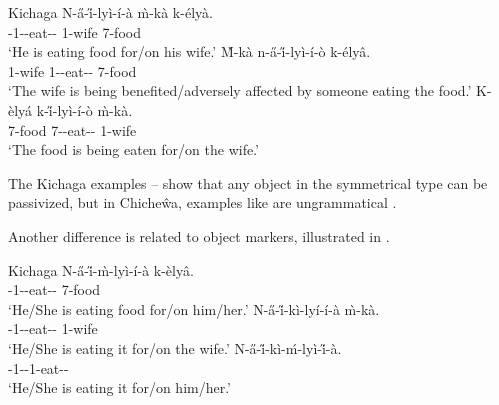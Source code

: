 \documentclass[output=paper,hidelinks]{langscibook}
\begin{document}
\ea\label{ex:African:18} Kichaga
\ea\label{ex:African:18a}
    {\gll N-\H{a}-\H{i}-lyì-í-à  \`{m}-kà    k-élyà.\\
        {\FOC}-1{\SBJ}-{\PROG}-eat-{}- 1-wife  7-food\\}
    \glt ‘He is eating food for/on his wife.’
\ex\label{ex:African:18b}
    {\gll \`{M}-kà   n-\H{a}-\H{i}-lyì-í-ò k-élyâ.\\
        1-wife 1{\SBJ}-{\PROG}-eat-{}-{\PASS}  7-food\\}  
    \glt ‘The wife is being benefited/adversely affected by someone eating the food.’
\ex\label{ex:African:18c}
    {\gll K-èlyá k-\H{i}-lyì-í-ò \`{m}-kà.\\ 
        7-food    7{\SBJ}-{\PROG}-eat-{}-{\PASS} 1-wife\\} 
    \glt ‘The food is being eaten for/on the wife.’
\z
\z
    

The Kichaga examples -- show that any object in the symmetrical type can be passivized, but in Chiche\^wa, examples like  are ungrammatical \citep{Baker:Theta}.

Another difference is related to object markers, illustrated in .

\ea\label{ex:African:19} Kichaga
\ea\label{ex:African:19a}
    \gll N-\H{a}-\H{i}-\`{m}-lyì-í-à k-èlyâ. \\
        {\FOC}-1{\SBJ}--eat-{}-  7-food \\
    \glt ‘He/She is eating food for/on him/her.’
\ex\label{ex:African:19b}
    {\gll N-\H{a}-\H{i}-kì-lyí-í-à    \`{m}-kà.\\ 
       {\FOC}-1{\SBJ}--eat-{}-  1-wife \\}
    \glt ‘He/She is eating it for/on the wife.’
\ex\label{ex:African:19c}
    {\gll N-\H{a}-\H{i}-kì-ḿ-lyì-\H{i}-à.\\ 
        {\FOC}-1{\SBJ}--1{\OBJ}-eat-{}-\\}
    \glt ‘He/She is eating it for/on him/her.’
\z
\z
\end{document}
